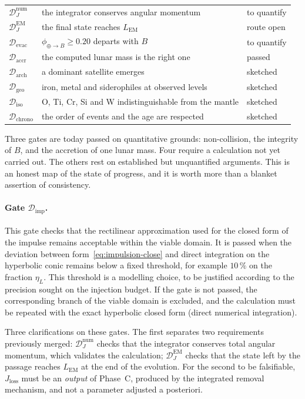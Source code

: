 \documentclass[11pt,a4paper,openany]{report}
\begin{document}
\begin{table}[htbp]
\begin{tabularx}{\textwidth}{>{\raggedright\arraybackslash}p{2.6cm}
>{\raggedright\arraybackslash}X >{\raggedright\arraybackslash}p{2.6cm}}
$\mathcal{D}_{J}^{\mathrm{num}}$ & the integrator conserves angular momentum & to quantify \\
$\mathcal{D}_{J}^{\mathrm{EM}}$ & the final state reaches $L_{\mathrm{EM}}$ & route open \\
$\mathcal{D}_{\mathrm{evac}}$ & $\phi_{\oplus\to B}\ge0.20$ departs with $B$ & to quantify \\
\midrule
$\mathcal{D}_{\mathrm{accr}}$ & the computed lunar mass is the right one & passed \\
$\mathcal{D}_{\mathrm{arch}}$ & a dominant satellite emerges & sketched \\
$\mathcal{D}_{\mathrm{geo}}$ & iron, metal and siderophiles at observed levels & sketched \\
$\mathcal{D}_{\mathrm{iso}}$ & O, Ti, Cr, Si and W indistinguishable from the mantle & sketched \\
$\mathcal{D}_{\mathrm{chrono}}$ & the order of events and the age are respected & sketched \\
\bottomrule
\end{tabularx}
\end{table}

Three gates are today passed on quantitative grounds: non-collision, the integrity of $B$, and the
accretion of one lunar mass. Four require a calculation not yet carried out. The others rest on
established but unquantified arguments. This is an honest map of the state of progress, and it is
worth more than a blanket assertion of consistency.

\paragraph{Gate $\mathcal{D}_{\mathrm{imp}}$.}
This gate checks that the rectilinear approximation used for the closed form of the impulse remains
acceptable within the viable domain. It is passed when the deviation between
form~\eqref{eq:impulsion-close} and direct integration on the hyperbolic conic remains below a fixed
threshold, for example $10\,\%$ on the fraction $\eta_L$. This threshold is a modelling choice, to
be justified according to the precision sought on the injection budget. If the gate is not passed,
the corresponding branch of the viable domain is excluded, and the calculation must be repeated
with the exact hyperbolic closed form (direct numerical integration).

Three clarifications on these gates. The first separates two requirements previously merged:
$\mathcal{D}_J^{\mathrm{num}}$ checks that the integrator conserves total angular momentum, which
validates the calculation; $\mathcal{D}_J^{\mathrm{EM}}$ checks that the state left by the passage
reaches $L_{\mathrm{EM}}$ at the end of the evolution. For the second to be falsifiable,
$J_{\mathrm{loss}}$ must be an \emph{output} of Phase~C, produced by the integrated removal
mechanism, and not a parameter adjusted a posteriori.
\end{document}

